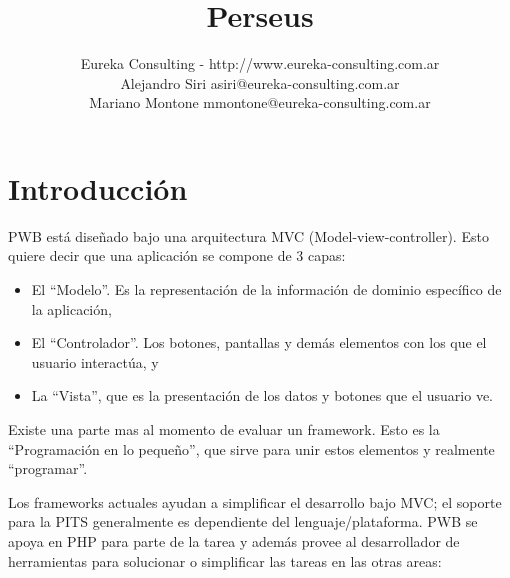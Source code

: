 \documentclass[a4paper,10pt]{article}
\title{Perseus}
\date{}
\author{Eureka Consulting - http://www.eureka-consulting.com.ar \\
		Alejandro Siri asiri@eureka-consulting.com.ar\\
		Mariano Montone mmontone@eureka-consulting.com.ar}
\begin{document}
\maketitle


\section{Introducción}

PWB está diseñado bajo una arquitectura MVC (Model-view-controller).
Esto quiere decir que una aplicación se compone de 3 capas:
\begin{itemize}
\item El ``Modelo''. Es la representación de la información de dominio específico de la aplicación,
\item El ``Controlador''. Los botones, pantallas y demás elementos con los que el usuario interactúa, y
\item La ``Vista'', que es la presentación de los datos y botones que el usuario ve.
\end{itemize}

Existe una parte mas al momento de evaluar un framework. Esto es la ``Programación en lo pequeño'', que sirve para unir estos elementos y realmente ``programar''.

Los frameworks actuales ayudan a simplificar el desarrollo bajo MVC; el soporte para la PITS generalmente es dependiente del lenguaje/plataforma. PWB se apoya en PHP para parte de la tarea y además provee al desarrollador de herramientas para solucionar o simplificar las tareas en las otras areas:
\end{document}
